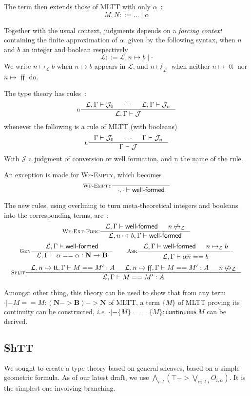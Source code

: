 \documentclass[11pt]{article}
\DeclareMathOperator{\mtrue}{\mathfrak{tt}}
\DeclareMathOperator{\mfalse}{\mathfrak{ff}}
\newcommand{\ovl}{\overline}
\newcommand{\0}{\mathbf{0}}
\newcommand{\1}{\mathbf{1}}
\newcommand{\nat}{\mathbf{N}}
\newcommand{\bool}{\mathbf{B}}
\newcommand{\tctx}{\Gamma}
\newcommand{\Wf}{\textsf{well-formed}}
\newcommand{\fctx}{\mathcal{L}}
\begin{document}
The term then extends those of MLTT with only $\alpha$~:
$$ M, N ::= \dots \mid \alpha$$

Together with the usual context, judgments depends on a \emph{forcing context} containing the finite approximation of $\alpha$, given by the following syntax, when $n$ and $b$ an integer and boolean respectively
$$ \fctx ::= \fctx, n \mapsto b \mid \cdot$$
We write $n\mapsto_\fctx b$ when $n\mapsto b$ appears in $\fctx$, and $n\not\mapsto_\fctx$ when neither $n\mapsto \mtrue$ nor $n\mapsto \mfalse$ do.

The type theory has rules~:
$$
    \inference[n]{\fctx,\tctx |- \mathcal{J}_0 & \cdots & \fctx,\tctx |- \mathcal{J}_n}{\fctx,\tctx |- \mathcal{J}}
$$
whenever the following is a rule of MLTT (with booleans)
$$
    \inference[n]{\tctx |- \mathcal{J}_0 & \cdots & \tctx |- \mathcal{J}_n}{\tctx |- \mathcal{J}}
$$
With $\mathcal{J}$ a judgment of conversion or well formation, and $\text{n}$ the name of the rule.

An exception is made for \textsc{Wf-Empty}, which becomes
$$
    \inference[\textsc{Wf-Empty}]{}{\cdot,\cdot |- \Wf}
$$

The new rules, using overlining to turn meta-theoretical integers and booleans into the corresponding terms, are~:
$$
    \inference[\textsc{Wf-Ext-Forc}]{\fctx,\tctx |- \Wf & n\not\mapsto_\fctx}{\fctx, n\mapsto b, \tctx |- \Wf}
$$
$$
    \inference[\textsc{Gen}]{\fctx,\tctx|- \Wf}{\fctx,\tctx |- \alpha == \alpha : \nat -> \bool}
    \qquad
    \inference[\textsc{Ask}]{\fctx,\tctx|- \Wf &n\mapsto_\fctx b}{\fctx, \tctx |- \alpha \ovl n == \ovl b}
$$
$$
    \inference[\textsc{Split}]{\fctx,n\mapsto \mtrue,\tctx |-M == M' :A & \fctx, n\mapsto\mfalse, \tctx |- M == M' : A & n\not\mapsto_\fctx}{\fctx,\tctx |- M == M' : A}
$$

Amongst other thing, this theory can be used to show that from any term $\cdot |- M == M : (\nat -> \bool) -> \nat$ of MLTT, a term $\{M\}$ of MLTT proving its continuity can be constructed, \emph{i.e.} $\cdot |- \{M\} == \{M\} : \mathsf{continuous}\ M$ can be derived.

\subsection{ShTT}

We sought to create a type theory based on general sheaves, based on a simple geometric formula.
As of our latest draft, we use $\bigwedge\limits_{i : I} \left(\top -> \bigvee\limits_{\alpha : A\ i}O_{i,\alpha}\right)$.
It is the simplest one involving branching.
\end{document}
